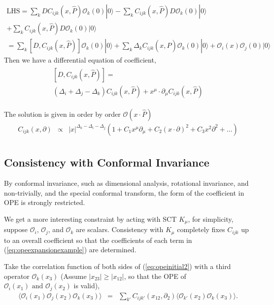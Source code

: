 \documentclass[12pt]{article}
\numberwithin{equation}{section}
\newcommand\be{\begin{eqnarray}}
\newcommand\ee{\end{eqnarray}}
\newcommand\cO{\mathcal{O}}
\newcommand\p[1]{\left(#1\right)}
\newcommand\ptl\partial
\newcommand\<\langle
\renewcommand\>\rangle
\newcommand\nn{\nonumber}
\renewcommand\.{\cdot}
\newcommand\De{\Delta}
\begin{document}
\[
\begin{split}
\text{LHS} = 
\sum_{k}DC_{ijk}(x,\hat{P})\cO_{k}(0)|0\> - \sum_{k}C_{ijk}(x,\hat{P})D\cO_{k}(0)|0\>
\\
+ \sum_{k}C_{ijk}(x,\hat{P})D\cO_{k}(0)|0\>
\\
= \sum_{k}\left[D,C_{ijk}(x,\hat{P})\right]\cO_{k}(0)|0\> + \sum_{k}\Delta_{k}C_{ijk}(x,\hat{P})\cO_{k}(0)|0\>+\cO_{i}(x)\cO_{j}(0)|0\>
\end{split}
\]
Then we have a differential equation of coefficient,
\be
\label{eq:differentialcoefficient}
\begin{split}
\left[D,C_{ijk}(x,\hat{P})\right] = 
\\
(\Delta_i+\Delta_j-\Delta_k)C_{ijk}(x,\hat{P}) + x^{\mu}\cdot\ptl_{\mu} C_{ijk}(x,\hat{P})
\end{split}
\ee

The solution is given in order by order $\cO(x\cdot \hat P)$
\be
\label{eq:opeexpansionexample}
C_{ijk}(x,\ptl) &\propto& |x|^{\De_k-\De_i-\De_j}\p{1 + C_1 x^\mu\ptl_\mu + C_2 (x\cdot\ptl)^2+ C_3 x^2 \ptl^2 + \dots}\nn\\
\ee

\subsection{Consistency with Conformal Invariance}
By conformal invariance, such as dimensional analysis, rotational invariance, and non-trivially, and the special conformal transform, the form of the coefficient in OPE is strongly restricted.

We get a more interesting constraint by acting with SCT $K_\mu$, for simplicity, suppose $\cO_i$, $\cO_j$, and $\cO_k$ are scalars. Consistency with $K_\mu$ completely fixes $C_{ijk}$ up to an overall coefficient so that the coefficients of each term in (\ref{eq:opeexpansionexample}) are determined.

Take the correlation function of both sides of (\ref{eq:opeinitial2}) with a third operator $\cO_k(x_3)$ (Assume $|x_{23}|\geq |x_{12}|$, so that the OPE of $\cO_i(x_1)\text{ and }\cO_j(x_2)$ is valid),
\be
\label{eq:threetotwo}
\<\cO_i(x_1)\cO_j(x_2)\cO_k(x_3)\> &=& \sum_{k'} C_{ijk'}(x_{12},\ptl_2)\<\cO_{k'}(x_2)\cO_k(x_3)\>.
\ee
\end{document}
